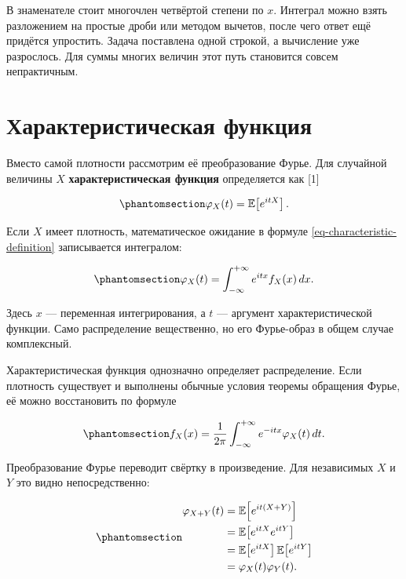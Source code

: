 \documentclass[
  russian,
  11pt,
  a4paper,
  open=any]{scrbook}
\begin{document}
В знаменателе стоит многочлен четвёртой степени по \(x\). Интеграл можно
взять разложением на простые дроби или методом вычетов, после чего ответ
ещё придётся упростить. Задача поставлена одной строкой, а вычисление
уже разрослось. Для суммы многих величин этот путь становится совсем
непрактичным.

\section{Характеристическая
функция}\label{ux445ux430ux440ux430ux43aux442ux435ux440ux438ux441ux442ux438ux447ux435ux441ux43aux430ux44f-ux444ux443ux43dux43aux446ux438ux44f}

Вместо самой плотности рассмотрим её преобразование Фурье. Для случайной
величины \(X\) \textbf{характеристическая функция} определяется как
{[}1{]}

\begin{equation}\protect\phantomsection\label{eq-characteristic-definition}{
\varphi_X(t)=\mathbb E\!\left[e^{itX}\right].
}\end{equation}

Если \(X\) имеет плотность, математическое ожидание в формуле
\ref{eq-characteristic-definition} записывается интегралом:

\begin{equation}\protect\phantomsection\label{eq-characteristic-continuous}{
\varphi_X(t)=
\int_{-\infty}^{+\infty}e^{itx}f_X(x)\,dx.
}\end{equation}

Здесь \(x\) --- переменная интегрирования, а \(t\) --- аргумент
характеристической функции. Само распределение вещественно, но его
Фурье-образ в общем случае комплексный.

Характеристическая функция однозначно определяет распределение. Если
плотность существует и выполнены обычные условия теоремы обращения
Фурье, её можно восстановить по формуле

\begin{equation}\protect\phantomsection\label{eq-characteristic-inversion}{
f_X(x)=
\frac{1}{2\pi}
\int_{-\infty}^{+\infty}
e^{-itx}\varphi_X(t)\,dt.
}\end{equation}

Преобразование Фурье переводит свёртку в произведение. Для независимых
\(X\) и \(Y\) это видно непосредственно:

\begin{equation}\protect\phantomsection\label{eq-characteristic-independent-sum}{
\begin{aligned}
\varphi_{X+Y}(t)
&=\mathbb E\!\left[e^{it(X+Y)}\right]\\
&=\mathbb E\!\left[e^{itX}e^{itY}\right]\\
&=\mathbb E\!\left[e^{itX}\right]
  \mathbb E\!\left[e^{itY}\right]\\
&=\varphi_X(t)\varphi_Y(t).
\end{aligned}
}\end{equation}
\end{document}
